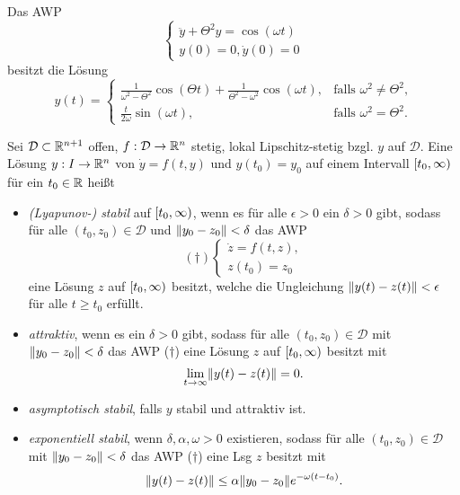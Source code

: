 \documentclass{cheat-sheet}
\newcommand{\D}{\mathcal{D}}
\begin{document}
\begin{bsp}
  Das AWP
  \[
    \left\{ \begin{array}{ll}
      \ddot{y} + \Theta^2 y = \cos(\omega t)\\
      y(0) = 0, \dot{y}(0) = 0
    \end{array} \right.
  \]
  besitzt die Lösung
  \[
    y(t) = \begin{cases}
      \tfrac{1}{\omega^2 - \Theta^2} \cos(\Theta t) + \tfrac{1}{\Theta^2 - \omega^2} \cos(\omega t), &\text{falls $\omega^2 \not= \Theta^2$,}\\
      \tfrac{t}{2 \omega} \sin(\omega t), &\text{falls $\omega^2 = \Theta^2$.}
    \end{cases}
  \]
\end{bsp}





\begin{defn}
  Sei $\D \subset \R^{n+1}$ offen, $f : \D \to \R^n$ stetig, lokal Lipschitz-stetig bzgl. $y$ auf $\D$. Eine Lösung $y : I \to \mathbb{R}^n$ von $\dot{y} = f(t, y)$ und $y(t_0) = y_0$ auf einem Intervall $\left[ t_0, \infty \right)$ für ein $t_0 \in \mathbb{R}$ heißt
  \begin{itemize}
    \item \emph{(Lyapunov-) stabil} auf $\left[ t_0, \infty \right)$, wenn es für alle $\epsilon > 0$ ein $\delta > 0$ gibt, sodass für alle $(t_0, z_0) \in \D$ und $\lVert y_0 - z_0\rVert < \delta$ das AWP
    \[
      (\dagger) \left\{ \begin{array}{ll}
        \dot{z} = f(t, z),\\
        z(t_0) = z_0
      \end{array} \right.
    \]
    eine Lösung $z$ auf $\left[ t_0, \infty \right)$ besitzt, welche die Ungleichung $\lVert y(t) - z(t)\rVert < \epsilon$ für alle $t \geq t_0$ erfüllt.
    \item \emph{attraktiv}, wenn es ein $\delta > 0$ gibt, sodass für alle $(t_0, z_0) \in \D$ mit $\lVert y_0 - z_0\rVert < \delta$ das AWP ($\dagger$) eine Lösung $z$ auf $\left[ t_0, \infty \right)$ besitzt mit
    \[ \lim_{t \to \infty} \lVert y(t) - z(t)\rVert = 0. \]
    \item \emph{asymptotisch stabil}, falls $y$ stabil und attraktiv ist.
    \item \emph{exponentiell stabil}, wenn $\delta, \alpha, \omega > 0$ existieren, sodass für alle $(t_0, z_0) \in \D$ mit $\lVert y_0 - z_0\rVert < \delta$ das AWP ($\dagger$) eine Lsg $z$ besitzt mit
    \[ \lVert y(t) - z(t)\rVert \leq \alpha \lVert y_0 - z_0\rVert e^{-\omega (t-t_0)}. \]
  \end{itemize}
\end{defn}
\end{document}
